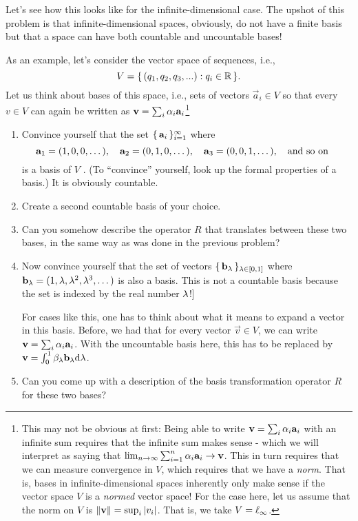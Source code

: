 \documentclass[12pt]{memoir}
\begin{document}
\begin{Ej}
    Let's see how this looks like for the infinite-dimensional case.
The upshot of this problem is that infinite-dimensional spaces, obviously, do not have a finite basis but that a space can have both countable and uncountable bases!\par 
As an example, let's consider the vector space of sequences, i.e.,
$$V = \{\,(q_1, q_2, q_3, . . .) : q_i\in\mathbb{R}\,\}.$$
Let us think about bases of this space, i.e., sets of vectors $\vec a_i\in V$ so that every $v \in V$ can again be written
as $\mathbf{v}=\sum_i\alpha_i\mathbf{a}_i$\footnote{This may not be obvious at first: Being able to write $\mathbf{v}=\sum_i\alpha_i\mathbf{a}_i$ with an infinite sum requires that the infinite sum makes
sense - which we will interpret as saying that $\lim_{n\to\infty}\sum_{i=1}^n\alpha_i\mathbf{a}_i\to \mathbf{v}$. This in turn requires that we can measure convergence
in $V$, which requires that we have a \emph{norm}. That is, bases in infinite-dimensional spaces inherently only make sense if the vector
space $V$ is a \emph{normed} vector space! For the case here, let us assume that the norm on $V$ is $\norm{\mathbf{v}}=\sup_i|v_i|$. That is, we take $V=\ell_\infty$.}
\begin{enumerate}
    \item Convince yourself that the set $\{\,\mathbf{a}_i\,\}_{i=1}^\infty$ where 
    $$\mathbf{a}_1=(1,0,0,\dots),\quad\mathbf{a}_2=(0,1,0,\dots),\quad\mathbf{a}_3=(0,0,1,\dots),\quad\text{and so on}\quad$$
    is a basis of $V$ . (To ``convince'' yourself, look up the formal properties of a basis.) It is obviously countable.
    \item Create a second countable basis of your choice.
    \item Can you somehow describe the operator $R$ that translates between these two bases, in the same way as was done in the previous problem?
    \item Now convince yourself that the set of vectors $\{\,\mathbf{b}_\lambda\,\}_{\lambda\in\left\lbrack0,1\right\rbrack}$ where $\mathbf{b}_\lambda=(1,\lambda,\lambda^2,\lambda^3,\dots)$ is also a basis. This is not a countable basis because the set is indexed by the real number $\lambda$!]\par 
    For cases like this, one has to think about what it means to expand a vector in this basis. Before, we had that for every vector $\vec v\in V$, we can write $\mathbf{v}=\sum_i\alpha_i\mathbf{a}_i$. With the uncountable basis here, this has
    to be replaced by $\mathbf{v}=\int_0^1\beta_\lambda\mathbf{b}_\lambda\dd\lambda$.
    \item Can you come up with a description of the basis transformation operator $R$ for these two bases?
\end{enumerate}
\end{Ej}
\end{document}
